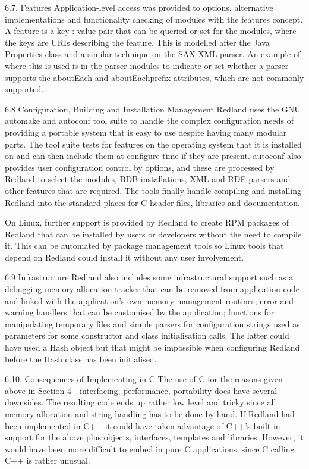 \documentclass[11pt]{article}
\begin{document}
    6.7. Features
    Application-level access was provided to options, alternative implementations and functionality checking of modules with the features concept. A feature is a key : value pair that can be queried or set for the modules, where the keys are URIs describing the feature. This is modelled after the Java Properties class and a similar technique on the SAX XML parser. An example of where this is used is in the parser modules to indicate or set whether a parser supports the aboutEach and aboutEachprefix attributes, which are not commonly supported.

    6.8 Configuration, Building and Installation Management
    Redland uses the GNU automake and autoconf tool suite to handle the complex configuration needs of providing a portable system that is easy to use despite having many modular parts. The tool suite tests for features on the operating system that it is installed on and can then include them at configure time if they are present. autoconf also provides user configuration control by options, and these are processed by Redland to select the modules, BDB installations, XML and RDF parsers and other features that are required. The tools finally handle compiling and installing Redland into the standard places for C header files, libraries and documentation.

    On Linux, further support is provided by Redland to create RPM packages of Redland that can be installed by users or developers without the need to compile it. This can be automated by package management tools so Linux tools that depend on Redland could install it without any user involvement.

    6.9 Infrastructure
    Redland also includes some infrastructural support such as a debugging memory allocation tracker that can be removed from application code and linked with the application's own memory management routines; error and warning handlers that can be customised by the application; functions for manipulating temporary files and simple parsers for configuration strings used as parameters for some constructor and class initialisation calls. The latter could have used a Hash object but that might be impossible when configuring Redland before the Hash class has been initialised.

    6.10. Consequences of Implementing in C
    The use of C for the reasons given above in Section 4 - interfacing, performance, portability does have several downsides. The resulting code ends up rather low level and tricky since all memory allocation and string handling has to be done by hand. If Redland had been implemented in C++ it could have taken advantage of C++'s built-in support for the above plus objects, interfaces, templates and libraries. However, it would have been more difficult to embed in pure C applications, since C calling C++ is rather unusual.
\end{document}
